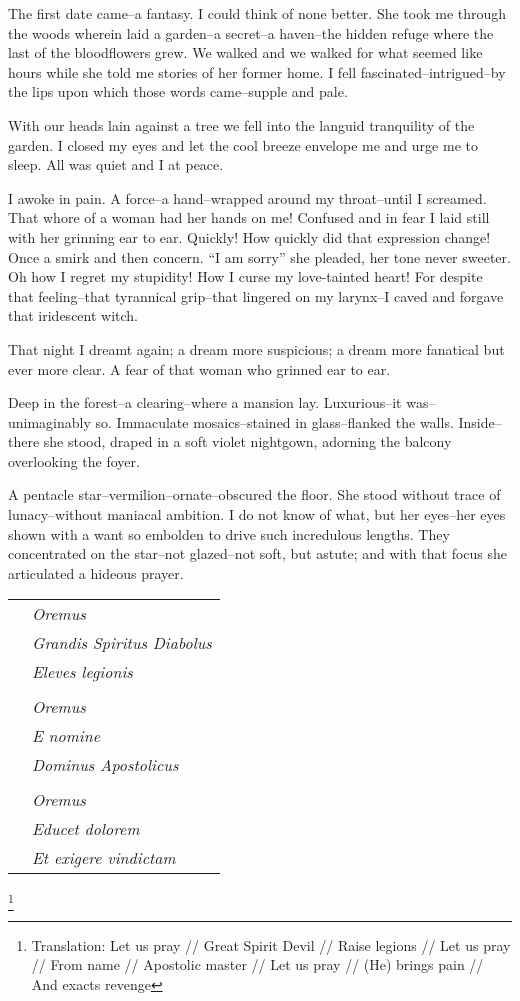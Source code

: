 \documentclass{article}
\begin{document}
\noindent %
The first date came--a fantasy.
I could think of none better. %
She took me through the woods wherein laid a garden--a
secret--a haven--the hidden refuge where
the last of the bloodflowers grew.
We walked and we walked for what seemed like hours
while she told me stories of her former home.
I fell fascinated--intrigued--by the lips
upon which those words came--supple and pale.


With our heads lain against a tree we
fell into the languid tranquility of the garden.
I closed my eyes and let the cool breeze envelope me
and urge me to sleep. All was quiet and I at peace.


I awoke in pain.
A force--a hand--wrapped around my throat--until I screamed.
That whore of a woman had her hands on me!
Confused and in fear I laid still
with her grinning ear to ear.
Quickly! How quickly did that expression change!
Once a smirk and then concern.
``I am sorry'' she pleaded, her tone never sweeter.
Oh how I regret my stupidity!
How I curse my love-tainted heart!
For despite that feeling--that
tyrannical grip--that lingered on my larynx--I
caved and forgave that iridescent witch.


That night I dreamt again; a dream more suspicious;
a dream more fanatical but ever more clear.
A fear of that woman who grinned ear to ear. %
\vvvv


\noindent
Deep in the forest--a clearing--where a mansion lay.
Luxurious--it was--unimaginably so.
Immaculate mosaics--stained in glass--flanked the walls.
Inside--there she stood, draped in a soft violet nightgown,
adorning the balcony overlooking the foyer.


A pentacle star--vermilion--ornate--obscured the floor.
She stood without trace of lunacy--without
maniacal ambition.
I do not know of what, but her eyes--her eyes
shown with a want so embolden to drive
such incredulous lengths.
They concentrated on the star--not
glazed--not soft, but astute; and with
that focus she articulated a hideous prayer.
\VV


\singlespace
\begin{tabular}{ll}
& \textit{Oremus} \\
& \textit{Grandis Spiritus Diabolus} \\
& \textit{Eleves legionis} \\
& \\
& \textit{Oremus} \\
& \textit{E nomine} \\
& \textit{Dominus Apostolicus} \\
& \\
& \textit{Oremus} \\
& \textit{Educet dolorem} \\
& \textit{Et exigere vindictam} \\
\end{tabular}\revertspace\footnote{
Translation:
Let us pray // Great Spirit Devil // Raise legions //
Let us pray // From name // Apostolic master //
Let us pray // (He) brings pain // And exacts revenge
} \vspace*{3ex}
\end{document}

